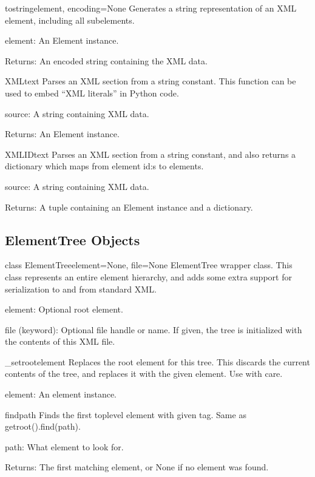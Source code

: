 \begin{funcdesc}{tostring}{element, encoding=None}
Generates a string representation of an XML element, including all
subelements.

element: An Element instance.

Returns: An encoded string containing the XML data.
\end{funcdesc}

\begin{funcdesc}{XML}{text}
Parses an XML section from a string constant.  This function can
be used to embed ``XML literals'' in Python code.

source: A string containing XML data.

Returns: An Element instance.
\end{funcdesc}

\begin{funcdesc}{XMLID}{text}
Parses an XML section from a string constant, and also returns
a dictionary which maps from element id:s to elements.

source: A string containing XML data.

Returns: A tuple containing an Element instance and a dictionary.
\end{funcdesc}


\subsection{ElementTree Objects\label{elementtree-elementtree-objects}}

\begin{classdesc}{class ElementTree}{element=None, file=None}
ElementTree wrapper class.  This class represents an entire element
hierarchy, and adds some extra support for serialization to and from
standard XML.

element: Optional root element.

file (keyword): Optional file handle or name.  If given, the
tree is initialized with the contents of this XML file.
\end{classdesc}

\begin{methoddesc}{_setroot}{element}
Replaces the root element for this tree.  This discards the
current contents of the tree, and replaces it with the given
element.  Use with care.

element: An element instance.
\end{methoddesc}

\begin{methoddesc}{find}{path}
Finds the first toplevel element with given tag.
Same as getroot().find(path).

path: What element to look for.

Returns: The first matching element, or None if no element was found.
\end{methoddesc}

